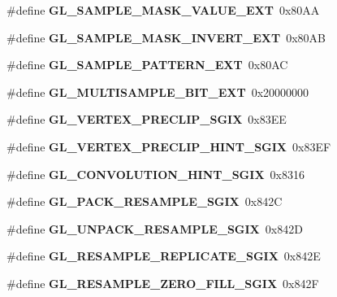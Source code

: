 \begin{DoxyCompactItemize}
\item 
\#define {\bfseries G\+L\+\_\+\+S\+A\+M\+P\+L\+E\+\_\+\+M\+A\+S\+K\+\_\+\+V\+A\+L\+U\+E\+\_\+\+E\+X\+T}~0x80\+A\+A\label{_s_d_l__opengl_8h_a092a15600541f2e635852718f68cf55e}

\item 
\#define {\bfseries G\+L\+\_\+\+S\+A\+M\+P\+L\+E\+\_\+\+M\+A\+S\+K\+\_\+\+I\+N\+V\+E\+R\+T\+\_\+\+E\+X\+T}~0x80\+A\+B\label{_s_d_l__opengl_8h_a5c334203a60c5e7b4331eb27ded36342}

\item 
\#define {\bfseries G\+L\+\_\+\+S\+A\+M\+P\+L\+E\+\_\+\+P\+A\+T\+T\+E\+R\+N\+\_\+\+E\+X\+T}~0x80\+A\+C\label{_s_d_l__opengl_8h_a87db3795f4978cda31f3687e86526c93}

\item 
\#define {\bfseries G\+L\+\_\+\+M\+U\+L\+T\+I\+S\+A\+M\+P\+L\+E\+\_\+\+B\+I\+T\+\_\+\+E\+X\+T}~0x20000000\label{_s_d_l__opengl_8h_ae7334e01278a1e31e28748ca8401ba36}

\item 
\#define {\bfseries G\+L\+\_\+\+V\+E\+R\+T\+E\+X\+\_\+\+P\+R\+E\+C\+L\+I\+P\+\_\+\+S\+G\+I\+X}~0x83\+E\+E\label{_s_d_l__opengl_8h_a042781876f40929162b2458d2ea5dafa}

\item 
\#define {\bfseries G\+L\+\_\+\+V\+E\+R\+T\+E\+X\+\_\+\+P\+R\+E\+C\+L\+I\+P\+\_\+\+H\+I\+N\+T\+\_\+\+S\+G\+I\+X}~0x83\+E\+F\label{_s_d_l__opengl_8h_a5ad3fa960e90332f3df0083db138e4cd}

\item 
\#define {\bfseries G\+L\+\_\+\+C\+O\+N\+V\+O\+L\+U\+T\+I\+O\+N\+\_\+\+H\+I\+N\+T\+\_\+\+S\+G\+I\+X}~0x8316\label{_s_d_l__opengl_8h_a436df34f89a945a336ac774004956901}

\item 
\#define {\bfseries G\+L\+\_\+\+P\+A\+C\+K\+\_\+\+R\+E\+S\+A\+M\+P\+L\+E\+\_\+\+S\+G\+I\+X}~0x842\+C\label{_s_d_l__opengl_8h_a9e20e46a2d1fa3ddfad995338c055c91}

\item 
\#define {\bfseries G\+L\+\_\+\+U\+N\+P\+A\+C\+K\+\_\+\+R\+E\+S\+A\+M\+P\+L\+E\+\_\+\+S\+G\+I\+X}~0x842\+D\label{_s_d_l__opengl_8h_a185fa0f99174308a66e712e70395bd9f}

\item 
\#define {\bfseries G\+L\+\_\+\+R\+E\+S\+A\+M\+P\+L\+E\+\_\+\+R\+E\+P\+L\+I\+C\+A\+T\+E\+\_\+\+S\+G\+I\+X}~0x842\+E\label{_s_d_l__opengl_8h_a389c1388b558612cd44b2c97e085bbc4}

\item 
\#define {\bfseries G\+L\+\_\+\+R\+E\+S\+A\+M\+P\+L\+E\+\_\+\+Z\+E\+R\+O\+\_\+\+F\+I\+L\+L\+\_\+\+S\+G\+I\+X}~0x842\+F\label{_s_d_l__opengl_8h_acbffee7ae25ff3daefc3a214a2a02a62}


\end{DoxyCompactItemize}
